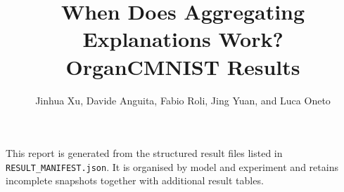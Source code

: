 \documentclass[10pt,a4paper]{article}
\title{When Does Aggregating Explanations Work?\\\large OrganCMNIST Results}
\author{Jinhua Xu, Davide Anguita, Fabio Roli, Jing Yuan, and Luca Oneto}
\date{}
\begin{document}
\maketitle

\noindent
This report is generated from the structured result files listed in
\texttt{RESULT\_MANIFEST.json}. It is organised by model and experiment
and retains incomplete snapshots together with additional result tables.


\end{document}
